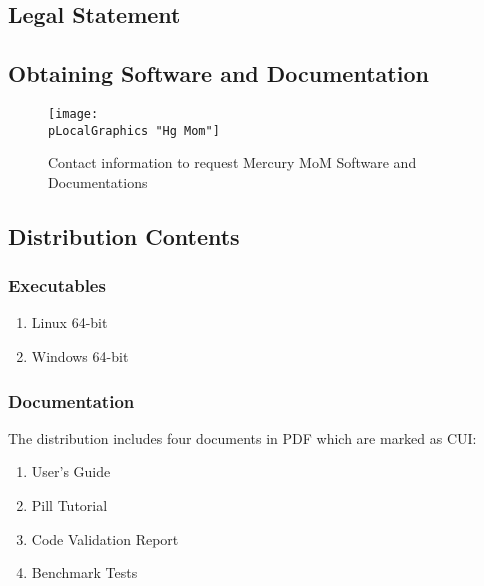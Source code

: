 \subsection{Legal Statement}


\subsection{Obtaining Software and Documentation}
\begin{figure}[htbp]
\begin{center}
	\texttt{[image: \\pLocalGraphics "Hg Mom"]}
\caption{Contact information to request Mercury MoM Software and Documentations}
\label{fig:kam-miller}
\end{center}
\end{figure}

\subsection{Distribution Contents}
\subsubsection{Executables}
\begin{enumerate}
	\item Linux 64-bit
	\item Windows 64-bit
\end{enumerate}

\subsubsection{Documentation}
The distribution includes four documents in PDF which are marked as CUI:
\begin{enumerate}
	\item User's Guide
	\item Pill Tutorial
	\item Code Validation Report
	\item Benchmark Tests
\end{enumerate}

\endinput  %
